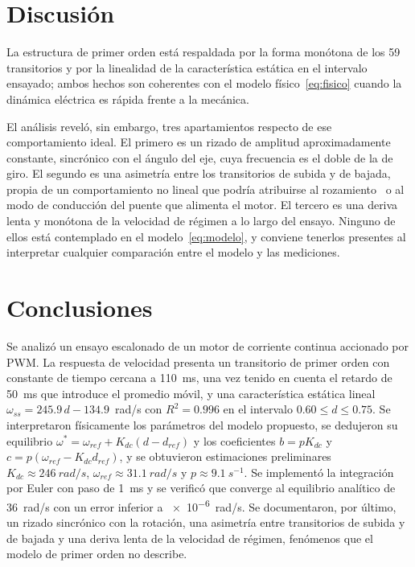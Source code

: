 \documentclass[journal,10pt,a4paper]{IEEEtran}
\begin{document}
\section{Discusión}\label{sec:disc}
La estructura de primer orden está respaldada por la forma monótona de los 59 transitorios y por la linealidad de la característica estática en el intervalo ensayado; ambos hechos son coherentes con el modelo físico~\eqref{eq:fisico} cuando la dinámica eléctrica es rápida frente a la mecánica.

El análisis reveló, sin embargo, tres apartamientos respecto de ese comportamiento ideal. El primero es un rizado de amplitud aproximadamente constante, sincrónico con el ángulo del eje, cuya frecuencia es el doble de la de giro. El segundo es una asimetría entre los transitorios de subida y de bajada, propia de un comportamiento no lineal que podría atribuirse al rozamiento~\cite{armstrong} o al modo de conducción del puente que alimenta el motor. El tercero es una deriva lenta y monótona de la velocidad de régimen a lo largo del ensayo. Ninguno de ellos está contemplado en el modelo~\eqref{eq:modelo}, y conviene tenerlos presentes al interpretar cualquier comparación entre el modelo y las mediciones.

\section{Conclusiones}\label{sec:conc}
Se analizó un ensayo escalonado de un motor de corriente continua accionado por PWM. La respuesta de velocidad presenta un transitorio de primer orden con constante de tiempo cercana a \SI{110}{ms}, una vez tenido en cuenta el retardo de \SI{50}{ms} que introduce el promedio móvil, y una característica estática lineal $\omega_{ss}=245.9\,d-134.9$~rad/s con $R^2=0.996$ en el intervalo $0.60\le d\le0.75$. Se interpretaron físicamente los parámetros del modelo propuesto, se dedujeron su equilibrio $\omega^*=\omega_{ref}+K_{dc}(d-d_{ref})$ y los coeficientes $b=pK_{dc}$ y $c=p(\omega_{ref}-K_{dc}d_{ref})$, y se obtuvieron estimaciones preliminares $K_{dc}\approx\SI{246}{rad/s}$, $\omega_{ref}\approx\SI{31.1}{rad/s}$ y $p\approx\SI{9.1}{s^{-1}}$. Se implementó la integración por Euler con paso de \SI{1}{ms} y se verificó que converge al equilibrio analítico de \SI{36}{rad/s} con un error inferior a \SI{e-6}{rad/s}. Se documentaron, por último, un rizado sincrónico con la rotación, una asimetría entre transitorios de subida y de bajada y una deriva lenta de la velocidad de régimen, fenómenos que el modelo de primer orden no describe.
\end{document}
